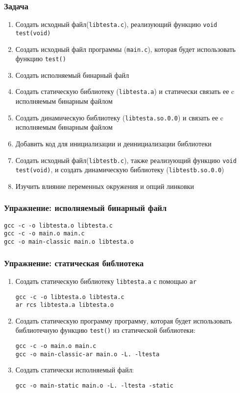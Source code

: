 \begin{frame}
	\frametitle{Задача}

	\begin{enumerate}
		\item Создать исходный файл({\tt libtesta.c}), реализующий функцию {\tt void test(void)}
		\item Создать исходный файл программы ({\tt main.c}), которая будет использовать функцию {\tt test()}
		\item Создать исполняемый бинарный файл
		\item Создать статическую библиотеку ({\tt libtesta.a})
			и статически связать ее c исполняемым бинарным файлом
		\item Создать динамическую библиотеку ({\tt libtesta.so.0.0})
			и связать ее c исполняемым бинарным файлом
		\framebreak
		\item Добавить код для инициализации и деинициализации библиотеки
		\item Создать исходный файл({\tt libtestb.c}), также реализующий функцию {\tt void test(void)},
			и создать динамическую библиотеку ({\tt libtestb.so.0.0})
		\item Изучить влияние переменных окружения и опций линковки
	\end{enumerate}
\end{frame}

\begin{frame}[fragile]
	\frametitle{Упражнение: исполняемый бинарный файл}

\begin{verbatim}
gcc -c -o libtesta.o libtesta.c
gcc -c -o main.o main.c
gcc -o main-classic main.o libtesta.o
\end{verbatim}
\end{frame}


\begin{frame}[fragile]
	\frametitle{Упражнение: статическая библиотека}

	\begin{enumerate}
		\item Создать статическую библиотеку {\tt libtesta.a} с помощью {\tt ar}

\begin{verbatim}
gcc -c -o libtesta.o libtesta.c
ar rcs libtesta.a libtesta.o
\end{verbatim}
			
		\item Создать статическую программу программу, которая будет использовать 
			библиотечную функцию {\tt test()} из статической библиотеки: 

\begin{verbatim}
gcc -c -o main.o main.c
gcc -o main-classic-ar main.o -L. -ltesta
\end{verbatim}

		\item Создать статически исполняемый файл: 

\begin{verbatim}
gcc -o main-static main.o -L. -ltesta -static
\end{verbatim}

	\end{enumerate}
\end{frame}



